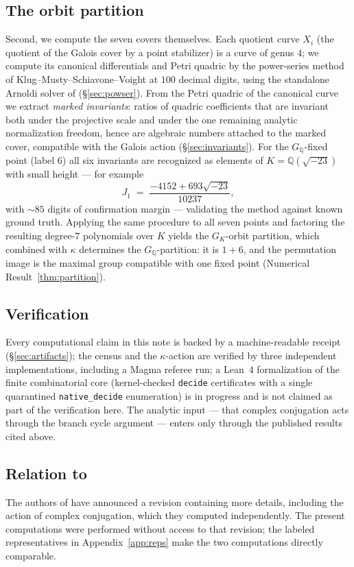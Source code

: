 \documentclass[11pt]{amsart}
\newcommand{\QQ}{\mathbb{Q}}
\newcommand{\GQ}{G_{\QQ}}
\newcommand{\GK}{G_{K}}
\newcommand{\sqm}{\sqrt{-23}}
\newcommand{\kap}{\kappa}
\theoremstyle{plain}
\theoremstyle{definition}
\begin{document}
\subsection*{The orbit partition}
Second, we compute the seven covers themselves. Each quotient curve
$X_i$ (the quotient of the Galois cover by a point stabilizer) is a
curve of genus $4$; we compute its canonical differentials and Petri
quadric by the power-series method of
Klug--Musty--Schiavone--Voight \cite{KMSV} at $100$ decimal
digits, using the standalone Arnoldi solver of \cite{BelyiRepo}
(\S\ref{sec:powser}). From the Petri quadric of the canonical curve we
extract \emph{marked invariants}: ratios of quadric coefficients that
are invariant both under the projective scale and under the one
remaining analytic normalization freedom, hence are algebraic numbers
attached to the marked cover, compatible with the Galois action
(\S\ref{sec:invariants}). For the $\GQ$-fixed point (label $6$) all
six invariants are recognized as elements of $K=\QQ(\sqm)$ with small
height --- for example
\[
  J_1 \;=\; \frac{-4152+693\sqm}{10237},
\]
with $\sim 85$ digits of confirmation margin --- validating the method
against known ground truth. Applying the same procedure to all seven
points and factoring the resulting degree-$7$ polynomials over $K$
yields the $\GK$-orbit partition, which combined with $\kap$
determines the $\GQ$-partition: it is $1+6$, and the permutation
image is the maximal group compatible with one fixed point
(Numerical Result~\ref{thm:partition}).

\subsection*{Verification}
Every computational claim in this note is backed by a machine-readable
receipt (\S\ref{sec:artifacts}); the census and the $\kap$-action are
verified by three independent implementations, including a Magma
referee run; a Lean~4 formalization of the finite combinatorial core
(kernel-checked \texttt{decide} certificates with a single
quarantined \texttt{native\_decide} enumeration) is in progress and
is not claimed as part of the verification here. The analytic input --- that complex
conjugation acts through the branch cycle argument --- enters only
through the published results cited above.

\subsection*{Relation to \cite{HJLPPZ}}
The authors of \cite{HJLPPZ} have announced a revision containing more
details, including the action of complex conjugation, which they
computed independently. The present computations were performed
without access to that revision; the labeled representatives in
Appendix~\ref{app:reps} make the two computations directly comparable.
\end{document}
